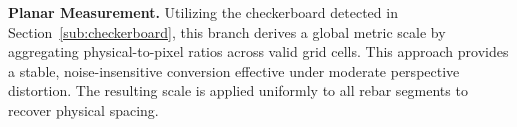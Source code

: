 \documentclass{article}
\begin{document}
\noindent \textbf{Planar Measurement.} Utilizing the checkerboard detected in Section~\ref{sub:checkerboard}, this branch derives a global metric scale by aggregating physical-to-pixel ratios across valid grid cells. This approach provides a stable, noise-insensitive conversion effective under moderate perspective distortion. The resulting scale is applied uniformly to all rebar segments to recover physical spacing.








\end{document}
